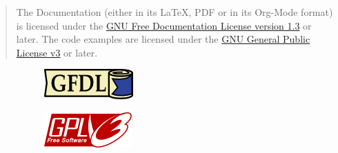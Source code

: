 \begin{titlepage}
	\begin{center}
		\vspace{.3cm}


		\begin{quote}
			{ \small
				The Documentation (either in its \LaTeX, PDF or in its Org-Mode format) is licensed under the
				\href{https://www.gnu.org/licenses/fdl-1.3.txt}{GNU Free Documentation License version 1.3}
				or later.  The code examples are licensed under the
				\href{https://www.gnu.org/licenses/gpl-3.0.txt}{GNU General Public License v3}
				or later. %
			}
		\end{quote}

		\begin{figure}[!hbt]
			\centering
			\begin{subfigure}{0.49\textwidth}
				\centering
				\includegraphics[height=.5cm]{images/gfdl.png}
				\label{fig:left1}
			\end{subfigure}
			\begin{subfigure}{0.49\textwidth}
				\centering
				\includegraphics[height=.5cm]{images/gplv3.png}
				\label{fig:right1}
			\end{subfigure}
			\label{fig:combined1}
		\end{figure}

\end{center}
\end{titlepage}
